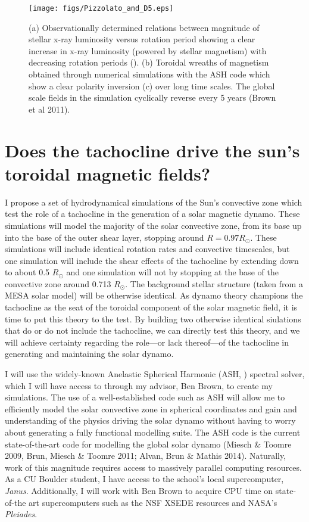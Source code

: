 \documentclass[aasms,12pt]{article}
\begin{document}
\begin{figure}[t!]
\centering
\texttt{[image: figs/Pizzolato\_and\_D5.eps]}
\caption{(a) Observationally determined relations between magnitude of stellar
	x-ray luminosity versus rotation period showing a clear increase in
	x-ray luminosity (powered by stellar magnetism) with decreasing rotation
	periods (\citealt{Pizzolato2003}).  (b) Toroidal wreaths of magnetism
	obtained through numerical simulations with the ASH code which show a
	clear polarity inversion (c) over long time scales.
	The global scale fields in the simulation cyclically reverse every 5 years
	(Brown et al 2011).
        \label{wreaths}}
\end{figure}


\section{Does the tachocline drive the sun's toroidal magnetic fields?}
I propose a set of hydrodynamical simulations of the Sun's convective zone
which test the role of a tachocline in the generation of a solar magnetic 
dynamo.  These simulations will model the majority of the solar convective
zone, from its base up into the base of the outer
shear layer, stopping
around $R = 0.97R_{\odot}$.  These simulations will include identical rotation
rates and convective timescales, but one simulation will include the shear
effects of the tachocline by extending down to about 0.5 $R_{\odot}$
and one simulation will not by stopping at the base of the convective zone
around 0.713 $R_{\odot}$.  The background stellar structure (taken from a MESA
solar model) will be otherwise identical.
As dynamo theory champions the tachocline as the seat of the toroidal component
of the solar magnetic field, it is time to put this theory to the test.
By building two otherwise identical siulations that do or do not include the tachocline,
we can directly test this theory, and we will achieve certainty regarding the role---or 
lack thereof---of the
tachocline in generating and maintaining the solar dynamo.

I will use the widely-known Anelastic Spherical Harmonic (ASH, 
\citealt{clune1999}) spectral solver, which I will have access to through my
advisor, Ben Brown, to create my simulations.  The use of a well-established
code such as ASH will allow me to
efficiently model the solar convective zone in spherical coordinates and gain
and understanding of the physics driving the solar dynamo without having to
worry about generating a fully functional modelling suite.  The ASH code is the
current state-of-the-art code for modelling the global solar dynamo 
(Miesch \& Toomre 2009, Brun, Miesch \& Toomre 2011; Alvan, Brun \& Mathis 2014).
Naturally, work
of this magnitude requires access to massively parallel computing resources.
As a CU Boulder student, I have access to the school's local supercomputer,
\emph{Janus}.  Additionally, I will work with Ben Brown to acquire CPU time on
state-of-the art supercomputers such as the NSF XSEDE resources and NASA's
\emph{Pleiades}. 
\end{document}
